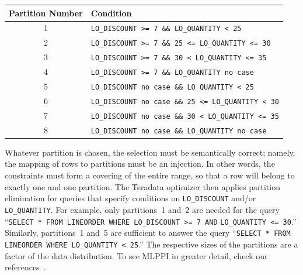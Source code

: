 \documentclass[runningheads]{comsis2}
\begin{document}
\begin{center}
{\footnotesize
\begin{tabular}{|c|l|}\hline 
Partition Number & Condition \\ \hline
1		& {{\tt LO\_DISCOUNT >= 7 \&\& LO\_QUANTITY < 25}} \\ \hline
2		& {{\tt LO\_DISCOUNT >= 7 \&\& 25 <= LO\_QUANTITY <= 30}} \\ \hline
3		& {{\tt LO\_DISCOUNT >= 7 \&\& 30 < LO\_QUANTITY <= 35}} \\ \hline
4		& {{\tt LO\_DISCOUNT >= 7 \&\& LO\_QUANTITY no case}}\\ \hline
5       & {{\tt LO\_DISCOUNT no case \&\& LO\_QUANTITY < 25}} \\ \hline 
6		& {{\tt LO\_DISCOUNT no case \&\& 25 <= LO\_QUANTITY < 30}} \\\hline								  	        
7		& {{\tt LO\_DISCOUNT no case \&\& 30 < LO\_QUANTITY <= 35}} \\ \hline
8		& {{\tt LO\_DISCOUNT no case \&\& LO\_QUANTITY no case}} \\ \hline
\end{tabular}
}
\end{center}

Whatever partition is chosen, 
the selection must be semantically correct; namely, 
the mapping of rows to partitions must be an injection. 
In other words, the constraints must form a covering of 
the entire range, so that a row will belong to exactly one and one partition. 
The Teradata optimizer then applies \hbox{partition} elimination for queries 
that specify conditions on {\tt LO\_DISCOUNT} and/or {\tt LO\_QUANTITY}. 
For \hbox{example}, only partitions~1 and~2 are needed for the query 
``{\tt SELECT * FROM LINEORDER WHERE LO\_DISCOUNT >= 7 AND} {\tt LO\_QUANTITY <= 30}.'' 
Similarly, partitions~1 and~5 are sufficient to answer the query 
``{\tt SELECT * FROM LINEORDER WHERE LO\_QUANTITY < 25}.'' 
\linebreak The respective sizes of the partitions are a factor of the data distribution. 
To see MLPPI in greater detail, check our references~\cite{klindt09mlppi,sinclair:ppi}. 


\end{document}
